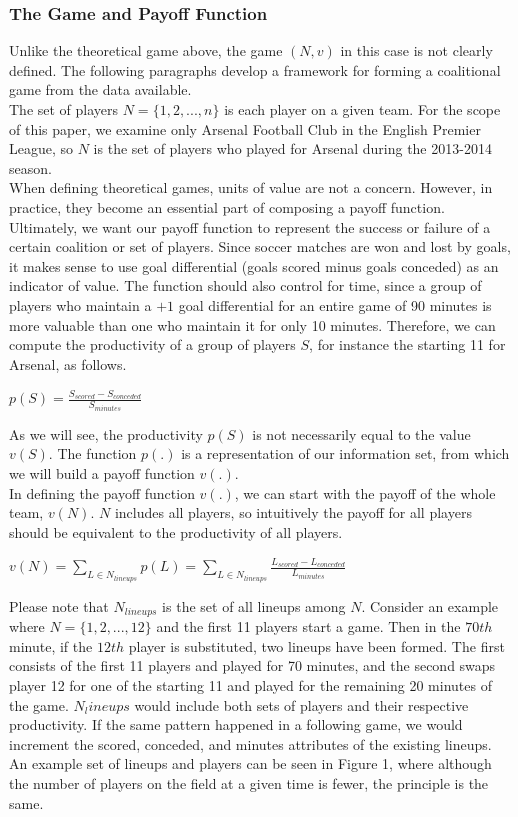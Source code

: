 \documentclass[a4paper,10pt]{article}
\newcommand{\br}{\\[10pt]}
\begin{document}
  \subsubsection*{The Game and Payoff Function}
  Unlike the theoretical game above, the game $(N, v)$ in this case is not clearly defined. The following paragraphs develop a framework for forming a coalitional game from the data available.
  \br
  The set of players $N = \{1, 2, ..., n\}$ is each player on a given team. For the scope of this paper, we examine only Arsenal Football Club in the English Premier League, so $N$ is the set of players who played for Arsenal during the 2013-2014 season. 
  \br
  When defining theoretical games, units of value are not a concern. However, in practice, they become an essential part of composing a payoff function. Ultimately, we want our payoff function to represent the success or failure of a certain coalition or set of players. Since soccer matches are won and lost by goals, it makes sense to use goal differential (goals scored minus goals conceded) as an indicator of value. The function should also control for time, since a group of players who maintain a $+1$ goal differential for an entire game of 90 minutes is more valuable than one who maintain it for only 10 minutes. Therefore, we can compute the productivity of a group of players $S$, for instance the starting 11 for Arsenal, as follows.
  \begin{center}
    $p(S) = \frac{S_{scored} - S_{conceded}}{S_{minutes}}$
  \end{center}
  As we will see, the productivity $p(S)$ is not necessarily equal to the value $v(S)$. The function $p(.)$ is a representation of our information set, from which we will build a payoff function $v(.)$.
  \br 
  In defining the payoff function $v(.)$, we can start with the payoff of the whole team, $v(N)$. $N$ includes all players, so intuitively the payoff for all players should be equivalent to the productivity of all players.
  \begin{center}
    $v(N) = \sum\limits_{L \in N_{lineups}} p(L) = \sum\limits_{L \in N_{lineups}} \frac{L_{scored} - L_{conceded}}{L_{minutes}}$
  \end{center}
  Please note that $N_{lineups}$ is the set of all lineups among $N$. Consider an example where $N = \{1, 2, ..., 12\}$ and the first 11 players start a game. Then in the $70th$ minute, if the $12th$ player is substituted, two lineups have been formed. The first consists of the first 11 players and played for 70 minutes, and the second swaps player 12 for one of the starting 11 and played for the remaining 20 minutes of the game. $N_lineups$ would include both sets of players and their respective productivity. If the same pattern happened in a following game, we would increment the scored, conceded, and minutes attributes of the existing lineups. An example set of lineups and players can be seen in Figure 1, where although the number of players on the field at a given time is fewer, the principle is the same.
\end{document}
